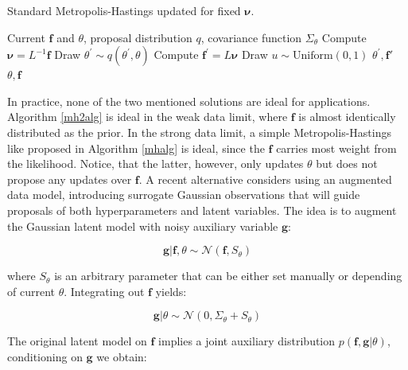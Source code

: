 \documentclass[10pt,a4paper,twoside]{book}
\begin{document}
\begin{algorithm}
	\caption{Standard Metropolis-Hastings updated for fixed $\boldsymbol{\nu}$.}
		\label{mh2alg}
		\begin{algorithmic}[1]
		\Require Current $\boldsymbol{f}$ and $\theta$, proposal distribution $q$, covariance function $\Sigma_\theta$ 
		\State Compute $\boldsymbol{\nu} = L^{-1}\boldsymbol{f}$
		\State Draw $\theta^{'} \sim q(\theta^{'}, \theta)$
		\State Compute $\boldsymbol{f}^{'} = L \boldsymbol{\nu}$
		\State Draw $u\sim \mathrm{Uniform}(0, 1)$
				\Return $\theta^{'}, \boldsymbol{f'}$
				\Else \;
				\Return $\theta, \boldsymbol{f}$
				\EndIf
		\end{algorithmic}
\end{algorithm}



In practice, none of the two mentioned solutions are ideal for applications. Algorithm \ref{mh2alg} is ideal in the weak data limit, where $\boldsymbol{f}$ is almost identically distributed as the prior. In the strong data limit, a simple Metropolis-Hastings like proposed in Algorithm \ref{mhalg} is ideal, since the $\boldsymbol{f}$ carries most weight from the likelihood. Notice, that the latter, however, only updates $\theta$ but does not propose any updates over $\boldsymbol{f}$. A recent alternative considers using an augmented data model, introducing surrogate Gaussian observations that will guide proposals of both hyperparameters and latent variables. The idea is to augment the Gaussian latent model with noisy auxiliary variable $\boldsymbol{g}$:

\begin{equation}\label{tointegrate}
\boldsymbol{g}|\boldsymbol{f},\theta \sim \mathcal{N}(\boldsymbol{f}, S_{\theta})
\end{equation}

where $S_\theta$ is an arbitrary parameter that can be either set manually or depending of current $\theta$. Integrating out $\boldsymbol{f}$ yields:

\begin{equation}
\boldsymbol{g}|\theta \sim \mathcal{N}(0, \Sigma_\theta + S_\theta)
\end{equation}

The original latent model on $\boldsymbol{f}$ implies a joint auxiliary distribution $p(\boldsymbol{f}, \boldsymbol{g}|\theta)$, conditioning on $\boldsymbol{g}$ we obtain:
\end{document}

